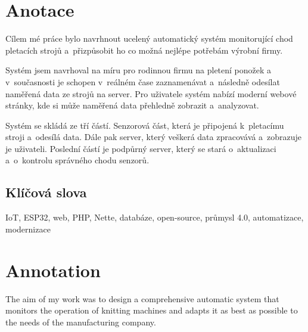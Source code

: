 \documentclass{template/socthesis}
\author{Jakub Andrýsek} %
\begin{document}

\maketitle %



\pagestyle{empty}

\section*{Anotace}
Cílem mé práce bylo navrhnout ucelený automatický systém monitorující chod pletacích strojů a~přizpůsobit ho co možná nejlépe potřebám výrobní firmy.

Systém jsem navrhoval na míru pro rodinnou firmu na pletení ponožek a v současnosti je schopen v~reálném čase zaznamenávat a~následně odesílat naměřená data ze strojů na server. 
Pro uživatele systém nabízí moderní webové stránky, kde si může naměřená data přehledně zobrazit a~analyzovat.

Systém se skládá ze tří částí. Senzorová část, která je připojená k~pletacímu stroji a~odesílá data.
Dále pak server, který veškerá data zpracovává a~zobrazuje je uživateli.
Poslední částí je podpůrný server, který se stará o~aktualizaci a~o~kontrolu správného chodu senzorů.

\subsection*{Klíčová slova}
IoT, ESP32, web, PHP, Nette, databáze, open-source, průmysl 4.0, automatizace, modernizace


\newpage %

\vspace{20mm}

\section*{Annotation}
The aim of my work was to design a comprehensive automatic system that monitors the operation of knitting machines and adapts it as best as possible to the needs of the manufacturing company.
\end{document}
